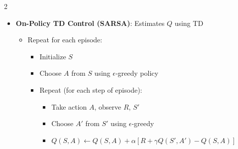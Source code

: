 \documentclass{article}
\providecommand{\tightlist}{%
  \setlength{\itemsep}{\GlobalItemSep}\setlength{\parskip}{\GlobalListParSkip}}
\newlength{\GlobalItemSep}
\newlength{\GlobalListParSkip}
\begin{document}
\begin{multicols}{2}
\begin{itemize}
\begin{itemize}
\begin{itemize}
\begin{itemize}
\begin{itemize}
          \begin{itemize}
          \tightlist
          \item
            \(N(S_t, A_t) \leftarrow N(S_t, A_t) + 1\)
          \item
            \(Q(S_t, A_t) \leftarrow Q(S_t, A_t) + \frac{1}{N(S_t, A_t)}(G_t - Q(S_t, A_t))\)

            \begin{itemize}
            \tightlist
            \item
              This is the incremental mean
            \end{itemize}
          \end{itemize}
        \item
          \(k \leftarrow k + 1\), \(\epsilon \leftarrow 1 / k\)

          \begin{itemize}
          \tightlist
          \item
            Anneal \(\epsilon\)
          \end{itemize}
        \item
          \(\pi_k = \epsilon-\text{greedy}(Q)\)
        \end{itemize}
      \end{itemize}
    \end{itemize}
  \item
    \textbf{On-Policy TD Control (SARSA)}: Estimates \(Q\) using TD

    \begin{itemize}
    \tightlist
    \item
      Repeat for each episode:

      \begin{itemize}
      \tightlist
      \item
        Initialize \(S\)
      \item
        Choose \(A\) from \(S\) using \(\epsilon\)-greedy policy
      \item
        Repeat (for each step of episode):

        \begin{itemize}
        \tightlist
        \item
          Take action \(A\), observe \(R\), \(S'\)
        \item
          Choose \(A'\) from \(S'\) using \(\epsilon\)-greedy
        \item
          \(Q(S, A) \leftarrow Q(S,A) + \alpha[R + \gamma Q(S', A') - Q(S, A)]\)


\end{itemize}
\end{itemize}
\end{itemize}
\end{itemize}
\end{itemize}
\end{multicols}
\end{document}
